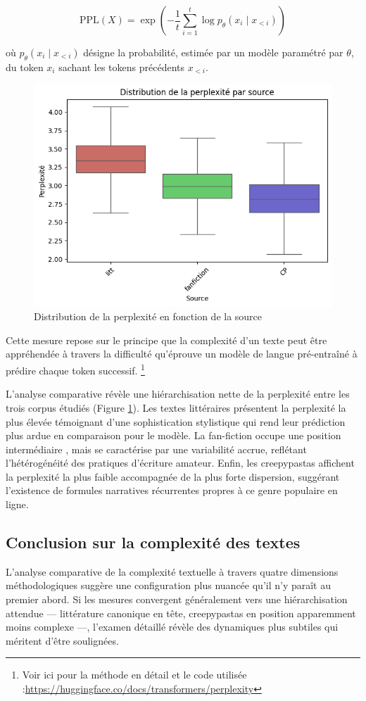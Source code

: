 \documentclass[12pt,a4paper,oneside,titlepage]{book} %
\begin{document}
\[
\text{PPL}(X) = \exp\left( -\frac{1}{t} \sum_{i=1}^{t} \log p_\theta(x_i \mid x_{<i}) \right)
\]

où \( p_\theta(x_i \mid x_{<i}) \) désigne la probabilité, estimée par un modèle paramétré par \( \theta \), du token \( x_i \) sachant les tokens précédents \( x_{<i} \).

\begin{figure}
    \centering
    \includegraphics[width=0.5\linewidth]{illustration/perplexity_source.png}
    \caption{Distribution de la perplexité en fonction de la source}
    \label{fig:perplexity}
\end{figure}

Cette mesure repose sur le principe que la complexité d'un texte peut être appréhendée à travers la difficulté qu'éprouve un modèle de langue pré-entraîné à prédire chaque token successif. \footnote{Voir ici pour la méthode en détail et le code utilisée :\url{https://huggingface.co/docs/transformers/perplexity}}

L'analyse comparative révèle une hiérarchisation nette de la perplexité entre les trois corpus étudiés (Figure \ref{fig:perplexity}). Les textes littéraires présentent la perplexité la plus élevée témoignant d'une sophistication stylistique qui rend leur prédiction plus ardue en comparaison pour le modèle. La fan-fiction occupe une position intermédiaire , mais se caractérise par une variabilité accrue, reflétant l'hétérogénéité des pratiques d'écriture amateur. Enfin, les creepypastas affichent la perplexité la plus faible accompagnée de la plus forte dispersion, suggérant l'existence de formules narratives récurrentes propres à ce genre populaire en ligne. 


\subsection{Conclusion sur la complexité des textes}

L'analyse comparative de la complexité textuelle à travers quatre dimensions méthodologiques suggère une configuration plus nuancée qu'il n'y paraît au premier abord. Si les mesures convergent généralement vers une hiérarchisation attendue — littérature canonique en tête, creepypastas en position apparemment moins complexe —, l'examen détaillé révèle des dynamiques plus subtiles qui méritent d'être soulignées.
\end{document}
